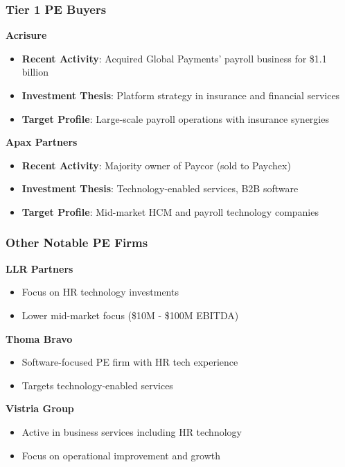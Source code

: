 \documentclass[12pt,a4paper]{article}
\begin{document}
\subsubsection{Tier 1 PE Buyers}

\textbf{Acrisure}
\begin{itemize}[leftmargin=0.5cm]
    \item \textbf{Recent Activity}: Acquired Global Payments' payroll business for \$1.1 billion
    \item \textbf{Investment Thesis}: Platform strategy in insurance and financial services
    \item \textbf{Target Profile}: Large-scale payroll operations with insurance synergies
\end{itemize}

\textbf{Apax Partners}
\begin{itemize}[leftmargin=0.5cm]
    \item \textbf{Recent Activity}: Majority owner of Paycor (sold to Paychex)
    \item \textbf{Investment Thesis}: Technology-enabled services, B2B software
    \item \textbf{Target Profile}: Mid-market HCM and payroll technology companies
\end{itemize}

\subsubsection{Other Notable PE Firms}

\textbf{LLR Partners}
\begin{itemize}[leftmargin=0.5cm]
    \item Focus on HR technology investments
    \item Lower mid-market focus (\$10M - \$100M EBITDA)
\end{itemize}

\textbf{Thoma Bravo}
\begin{itemize}[leftmargin=0.5cm]
    \item Software-focused PE firm with HR tech experience
    \item Targets technology-enabled services
\end{itemize}

\textbf{Vistria Group}
\begin{itemize}[leftmargin=0.5cm]
    \item Active in business services including HR technology
    \item Focus on operational improvement and growth
\end{itemize}
\end{document}
